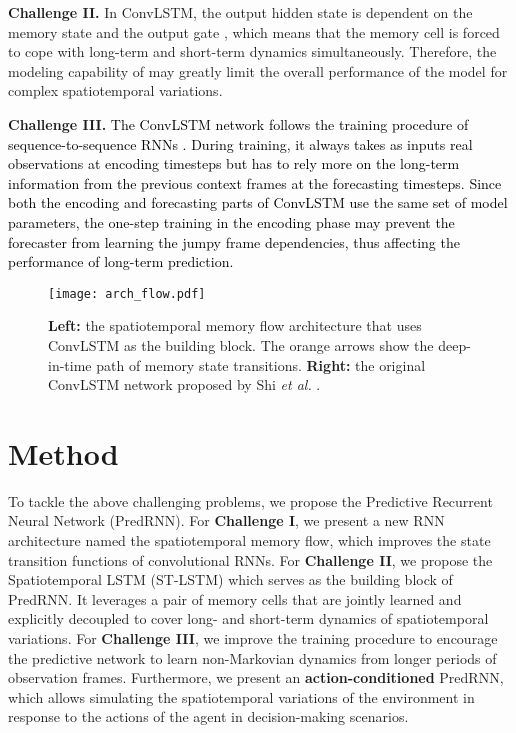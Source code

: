 \documentclass[10pt,journal,compsoc]{IEEEtran}
\newcommand{\revise}[1]{{\textcolor{black}{#1}}}
\newcommand{\myparagraph}[1]{\vspace{5pt} \noindent \textbf{#1.}}
\begin{document}
\myparagraph{Challenge II}
In ConvLSTM, the output hidden state  is dependent on the memory state  and the output gate , which means that the memory cell is forced to cope with long-term and short-term dynamics simultaneously. Therefore, the modeling capability of  may greatly limit the overall performance of the model for complex spatiotemporal variations.

\myparagraph{Challenge III}
\revise{The ConvLSTM network follows the training procedure of sequence-to-sequence RNNs \cite{Sutskever2014Sequence}. During training, it always takes as inputs real observations at encoding timesteps but has to rely more on the long-term information from the previous context frames at the forecasting timesteps.
Since both the encoding and forecasting parts of ConvLSTM use the same set of model parameters, the one-step training in the encoding phase may prevent the forecaster from learning the jumpy frame dependencies, thus affecting the performance of long-term prediction. 
}




\begin{figure*}[t]
  \centering
  \texttt{[image: arch\_flow.pdf]}
  \vskip -0.1in
  \caption{\textbf{Left:} the spatiotemporal memory flow architecture that uses ConvLSTM as the building block. The orange arrows show the deep-in-time path of memory state transitions. \textbf{Right:} the original ConvLSTM network proposed by Shi \textit{et al.} \cite{shi2015convolutional}.
  }
  \label{fig:rnn_compare}
  \vspace{-10pt}
\end{figure*}


\section{Method}
To tackle the above challenging problems, we propose the Predictive Recurrent Neural Network (PredRNN).
For \textbf{Challenge I}, we present a new RNN architecture named the spatiotemporal memory flow, which improves the state transition functions of convolutional RNNs. 
For \textbf{Challenge II}, we propose the Spatiotemporal LSTM (ST-LSTM) which serves as the building block of PredRNN. It leverages a pair of memory cells that are jointly learned and explicitly decoupled to cover long- and short-term dynamics of spatiotemporal variations.
For \textbf{Challenge III}, we improve the training procedure to encourage the predictive network to learn non-Markovian dynamics from longer periods of observation frames.
Furthermore, we present an \textbf{action-conditioned} PredRNN, which allows simulating the spatiotemporal variations of the environment in response to the actions of the agent in decision-making scenarios.
\end{document}

